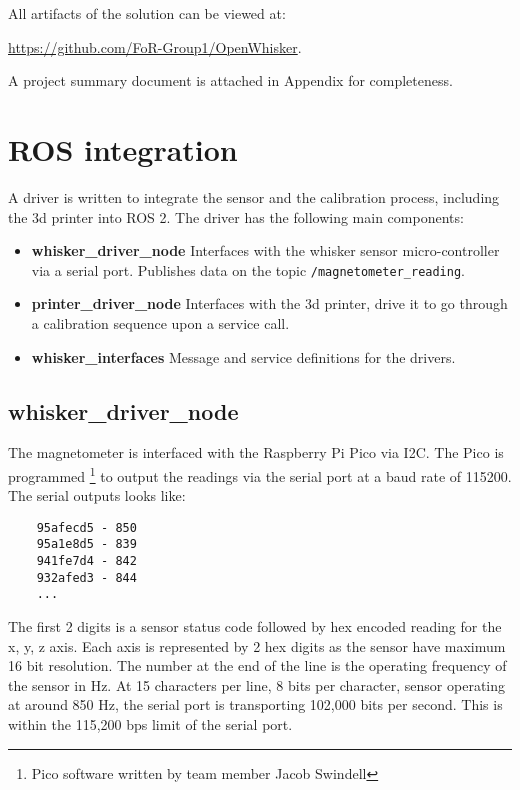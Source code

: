 \documentclass{report}
\begin{document}
All artifacts of the solution can be viewed at:

\url{https://github.com/FoR-Group1/OpenWhisker}.

A project summary document is attached in Appendix for completeness.

\vspace{20px}


\section{ROS integration}

A driver is written to integrate the sensor and the calibration process, including the 3d printer into ROS 2. The driver has the following main components:

\begin{itemize}
    \item \textbf{whisker\_driver\_node} Interfaces with the whisker sensor micro-controller via a serial port. Publishes data on the topic \verb|/magnetometer_reading|.
    \item  \textbf{printer\_driver\_node} Interfaces with the 3d printer, drive it to go through a calibration sequence upon a service call.
    \item \textbf{whisker\_interfaces} Message and service definitions for the drivers.
\end{itemize}

\subsection{whisker\_driver\_node}

The magnetometer is interfaced with the Raspberry Pi Pico via I2C. The Pico is programmed \footnote{Pico software written by team member Jacob Swindell} to output the readings via the serial port at a baud rate of 115200. The serial outputs looks like:
\begin{verbatim}
    95afecd5 - 850
    95a1e8d5 - 839
    941fe7d4 - 842
    932afed3 - 844
    ...
\end{verbatim}

The first 2 digits is a sensor status code followed by hex encoded reading for the x, y, z axis. Each axis is represented by 2 hex digits as the sensor have maximum 16 bit resolution. The number at the end of the line is the operating frequency of the sensor in Hz. At 15 characters per line, 8 bits per character, sensor operating at around 850 Hz, the serial port is transporting 102,000 bits per second. This is within the 115,200 bps limit of the serial port.
\end{document}
